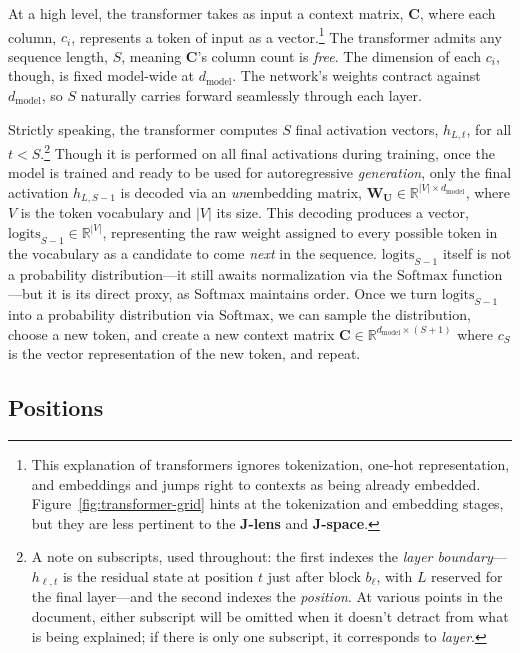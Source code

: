 \documentclass{article}
\newcommand{\logits}{\mathrm{logits}}
\newcommand{\smax}{\mathrm{Softmax}}
\newcommand{\dmodel}{d_{\text{model}}}
\begin{document}
At a high level, the transformer takes as input a context matrix, \(\mathbf{C}\), where each column, \(c_i\), represents a token of input as a vector.\footnote{This explanation of transformers ignores tokenization, one-hot representation, and embeddings and jumps right to contexts as being already embedded. Figure~\ref{fig:transformer-grid} hints at the tokenization and embedding stages, but they are less pertinent to the \textbf{J-lens} and \textbf{J-space}.} The transformer admits any sequence length, \(S\), meaning \(\mathbf{C}\)'s column count is \textit{free}. The dimension of each \(c_i\), though, is fixed model-wide at \(\dmodel\). The network's weights contract against \(\dmodel\), so \(S\) naturally carries forward seamlessly through each layer.

Strictly speaking, the transformer computes \(S\) final activation vectors, \(h_{L, t}\), for all \(t < S\).\footnote{A note on subscripts, used throughout: the first indexes the \textit{layer boundary}---\(h_{\ell, t}\) is the residual state at position \(t\) just after block \(b_\ell\), with \(L\) reserved for the final layer---and the second indexes the \textit{position}. At various points in the document, either subscript will be omitted when it doesn't detract from what is being explained; if there is only one subscript, it corresponds to \textit{layer}.} Though it is performed on all final activations during training, once the model is trained and ready to be used for autoregressive \textit{generation}, only the final activation \(h_{L, S-1}\) is decoded via an \textit{un}embedding matrix, \(\mathbf{W_U} \in \mathbb{R}^{|V| \times \dmodel}\), where \(V\) is the token vocabulary and \(|V|\) its size. This decoding produces a vector, \(\logits_{S-1} \in \mathbb{R}^{|V|}\), representing the raw weight assigned to every possible token in the vocabulary as a candidate to come \textit{next} in the sequence. \(\logits_{S-1}\) itself is not a probability distribution---it still awaits normalization via the \(\smax\) function---but it is its direct proxy, as Softmax maintains order. Once we turn \(\logits_{S-1}\) into a probability distribution via \(\smax\), we can sample the distribution, choose a new token, and create a new context matrix $\mathbf{C} \in \mathbb{R}^{\dmodel \times (S+1)}$ where \(c_S\) is the vector representation of the new token, and repeat. 

\subsection{Positions}
\end{document}
